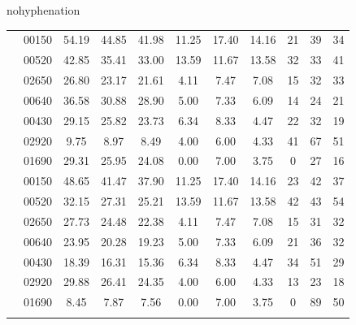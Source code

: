 \begin{hyphenrules}{nohyphenation}
\begin{table}[H]
{\begin{tabular}{>{\raggedleft\arraybackslash}p{4cm} lccCccCccc}
             & 00150 & 54.19 & 44.85 & 41.98 & 11.25 & 17.40 & 14.16 & 21 & 39 & 34 \\
            & 00520 &                       42.85 & 35.41 & 33.00 &     13.59 & 11.67 & 13.58 & 32 & 33 & 41 \\
            & 02650 &                       26.80 & 23.17 & 21.61 &     4.11 & 7.47 & 7.08 &    15 & 32 & 33 \\
            & 00640 &                       36.58 & 30.88 & 28.90 &     5.00 & 7.33 & 6.09 &    14 & 24 & 21 \\
            & 00430 &                       29.15 & 25.82 & 23.73 &     6.34 & 8.33 & 4.47 &    22 & 32 & 19 \\
            & 02920 &                       9.75 & 8.97 & 8.49 &        4.00 & 6.00 & 4.33 &    41 & 67 & 51 \\
            & 01690 &                       29.31 & 25.95 & 24.08 &     0.00 & 7.00 & 3.75 &    0 & 27 & 16 \\
            \midrule
            
             & 00150 & 48.65 & 41.47 & 37.90 & 11.25 & 17.40 & 14.16 & 23 & 42 & 37 \\
            & 00520 &                       32.15 & 27.31 & 25.21 &     13.59 & 11.67 & 13.58 & 42 & 43 & 54 \\
            & 02650 &                       27.73 & 24.48 & 22.38 &     4.11 & 7.47 & 7.08 &    15 & 31 & 32 \\
            & 00640 &                       23.95 & 20.28 & 19.23 &     5.00 & 7.33 & 6.09 &    21 & 36 & 32 \\
            & 00430 &                       18.39 & 16.31 & 15.36 &     6.34 & 8.33 & 4.47 &    34 & 51 & 29 \\
            & 02920 &                       29.88 & 26.41 & 24.35 &     4.00 & 6.00 & 4.33 &    13 & 23 & 18 \\
            & 01690 &                       8.45 & 7.87 & 7.56 &        0.00 & 7.00 & 3.75 &    0 & 89 & 50 \\
            \bottomrule
            
        \end{tabular}}
    \end{table}
\end{hyphenrules}


